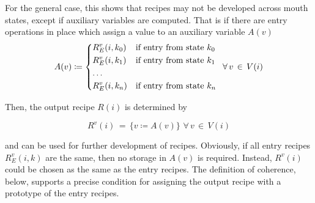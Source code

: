 \documentclass[12pt,a4paper]{scrartcl}
\begin{document}
For the general case, this shows that recipes may not be developed across
mouth states, except if auxiliary variables are computed. That is if there
are entry operations in place which assign a value to an auxiliary variable $A(v)$
\begin{equation}
    A(v) \coloneqq   \begin{dcases*}
             R^v_E(i,k_0) & if entry from state $k_0$ \\
             R^v_E(i,k_1) & if entry from state $k_1$ \\
             \ldots \\
             R^v_E(i,k_n) & if entry from state $k_n$ \\
            \end{dcases*}
            \,\forall\,v\,\in\,V(i)
\end{equation}

Then, the output recipe $R(i)$ is determined by

\begin{equation}
    R^v(i) \,=\, \{ v \coloneqq A(v) \}\,\,\forall\,v\,\in\,V(i)
\end{equation}

and can be used for further development of recipes. Obviously, if all entry
recipes $R^v_E(i,k)$ are the same, then no storage in $A(v)$ is required.
Instead, $R^v(i)$ could be chosen as the same as the entry recipes. The
definition of coherence, below, supports a precise condition for assigning the
output recipe with a prototype of the entry recipes. 
\end{document}
